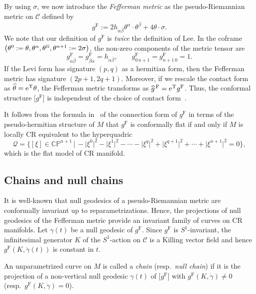 \documentclass[11pt]{article}
\numberwithin{equation}{section}
\renewcommand\a{\alpha}
\renewcommand\b{\beta}
\newcommand\g{\gamma}
\renewcommand\th{\theta}
\newcommand\ol{\overline}
\newcommand{\wh}{\widehat}
\numberwithin{equation}{section}
\begin{document}
By using $\sigma$, we now introduce the {\it Fefferman metric} as the pseudo-Riemannian metric on $\mathcal{C}$ defined by
\[
g^{\mathrm{F}}:=2h_{\a\ol\b}\theta^\a\cdot \theta^{\ol\b}+4\theta\cdot \sigma.
\]
We note that our definition of $g^{\mathrm{F}}$ is {\it twice} the definition of Lee. In the coframe $\smash{\bigl(\th^0:=\th, \th^\a, \th^{\ol\a}},\allowbreak \smash{\th^{n+1}:=2\sigma\bigr)}$, the non-zero components of the metric tensor are
\[
g^{\mathrm{F}}_{\a\ol\b}=g^{\mathrm{F}}_{\ol\b\a}=h_{\a\ol\b}, \qquad
g^{\mathrm{F}}_{0\, n+1}=g^{\mathrm{F}}_{n+1\, 0}=1.
\]
If the Levi form has signature $(p, q)$ as a hermitian form, then the Fefferman metric has signature $(2p+1, 2q+1)$. Moreover, if we rescale the contact form
as $\wh\th={\rm e}^\Upsilon\th$, the Fefferman metric transforms as
$\wh{g}^{\,\mathrm{F}}={\rm e}^\Upsilon g^{\mathrm{F}}$. Thus, the conformal structure $\bigl[g^{\mathrm{F}}\bigr]$ is independent of the choice of contact form~\cite[Theorem~5.17]{Lee}.

It follows from the formula in~\cite{Lee} of the connection form of $g^{\mathrm{F}}$ in terms of the pseudo-hermitian structure of $M$ that $g^{\mathrm{F}}$ is conformally flat if and only if $M$ is locally CR equivalent to the hyperquadric
\[
\mathcal{Q}=\bigl\{[\xi]\in \mathbb{CP}^{n+1} \,\big|\, -\bigl|\xi^0\bigr|^2-\bigl|\xi^1\bigr|^2-\cdots-
\bigl|\xi^q\bigr|^2+\bigl|\xi^{q+1}\bigr|^2+\cdots+\bigl|\xi^{n+1}\bigr|^2=0 \bigr\},
\]
which is the flat model of CR manifold.

\subsection{Chains and null chains}
It is well-known that null geodesics of a pseudo-Riemannian metric are conformally invariant up to reparametrizations. Hence, the projections of null geodesics of the Fefferman metric provide an invariant family of curves on CR manifolds. Let $\g(t)$ be a null geodesic of $g^{\mathrm{F}}$. Since $g^{\mathrm{F}}$ is $S^1$-invariant, the infinitesimal generator $K$ of the $S^1$-action on $\mathcal{C}$ is a Killing vector field and hence $g^{\mathrm{F}}(K, \dot\g(t))$ is constant in $t$.

\begin{Definition}
An unparametrized curve on $M$ is called a {\it chain} (resp.\ {\it null chain}) if it is the projection of a non-vertical null geodesic $\g(t)$ of $\bigl[g^{\mathrm{F}}\bigr]$ with $g^{\mathrm{F}}(K, \dot\g)\neq0$ \big(resp.\ $g^{\mathrm{F}}(K, \dot\g)=0$\big).
\end{Definition}
\end{document}
